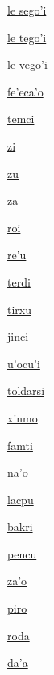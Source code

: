 {\hyperlink{val:le segohi}{le sego'i}}{}{}{}

{\hyperlink{val:le tegohi}{le tego'i}}{}{}{}

{\hyperlink{val:le vegohi}{le vego'i}}{}{}{}

{\hyperlink{val:fehecaho}{fe'eca'o}}{}{}{}

{\hyperlink{val:temci}{temci}}{}{}{}

{\hyperlink{val:zi}{zi}}{}{}{}

{\hyperlink{val:zu}{zu}}{}{}{}

{\hyperlink{val:za}{za}}{}{}{}

{\hyperlink{val:roi}{roi}}{}{}{}

{\hyperlink{val:rehu}{re'u}}{}{}{}

{\hyperlink{val:terdi}{terdi}}{}{}{}

{\hyperlink{val:tirxu}{tirxu}}{}{}{}

{\hyperlink{val:jinci}{jinci}}{}{}{}

{\hyperlink{val:uhocuhi}{u'ocu'i}}{}{}{}

{\hyperlink{val:toldarsi}{toldarsi}}{}{}{}

{\hyperlink{val:xinmo}{xinmo}}{}{}{}

{\hyperlink{val:famti}{famti}}{}{}{}

{\hyperlink{val:naho}{na'o}}{}{}{}

{\hyperlink{val:lacpu}{lacpu}}{}{}{}

{\hyperlink{val:bakri}{bakri}}{}{}{}

{\hyperlink{val:pencu}{pencu}}{}{}{}

{\hyperlink{val:zaho}{za'o}}{}{}{}

{\hyperlink{val:piro}{piro}}{}{}{}

{\hyperlink{val:roda}{roda}}{}{}{}

{\hyperlink{val:daha}{da'a}}{}{}{}

